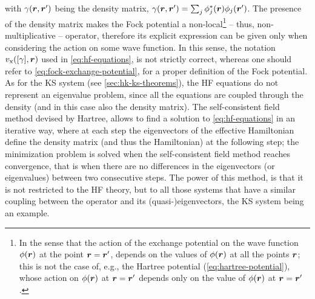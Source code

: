 with $\gamma({\bm r},{\bm r}')$ being the density matrix, $\gamma({\bm r},{\bm r}') = \sum_j \phi_j^*({\bm r}) \phi_j({\bm r}')$. The presence of the density matrix makes the Fock potential a non-local\footnote{In the sense that the action of the exchange potential on the wave function $\phi({\bm r})$ at the point ${\bm r}={\bm r}'$, depends on the values of $\phi({\bm r})$ at all the points ${\bm r}$; this is not the case of, e.g., the Hartree potential (\cref{eq:hartree-potential}), whose action on $\phi({\bm r})$ at ${\bm r}={\bm r}'$ depends only on the value of $\phi({\bm r})$ at ${\bm r}={\bm r}'$.} -- thus, non-multiplicative -- operator, therefore its explicit expression can be given only when considering the action on some wave function. In this sense, the notation $v_{\rm x}([\gamma],{\bm r})$ used in \cref{eq:hf-equations}, is not strictly correct, whereas one should refer to \cref{eq:fock-exchange-potential}, for a proper definition of the Fock potential. As for the KS system (see \cref{sec:hk-ks-theorems}), the HF equations do not represent an eigenvalue problem, since all the equations are coupled through the density (and in this case also the density matrix). The self-consistent field method devised by Hartree, allows to find a solution to \cref{eq:hf-equations} in an iterative way, where at each step the eigenvectors of the effective Hamiltonian define the density matrix (and thus the Hamiltonian) at the following step; the minimization problem is solved when the self-consistent field method reaches convergence, that is when there are no differences in the eigenvectors (or eigenvalues) between two consecutive steps. The power of this method, is that it is not restricted to the HF theory, but to all those systems that have a similar coupling between the operator and its (quasi-)eigenvectors, the KS system being an example.

